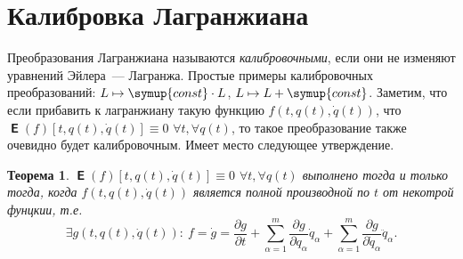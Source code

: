 \documentclass[11pt,a4paper]{article}
\newtheorem{Theorem}{Теорема}[section]
\theoremstyle{definition}
\numberwithin{equation}{section}
\begin{document}
\section{Калибровка Лагранжиана}
Преобразования Лагранжиана называются {\em калибровочными}, если они не изменяют уравнений Эйлера~— Лагранжа. Простые примеры калибровочных преобразований: $L\mapsto\symup{const}\cdot L$, $L\mapsto L+\symup{const}$. Заметим, что если прибавить к лагранжиану такую функцию $f(t,q(t),\dot{q}(t))$, что $\mbfsansE(f)[t,q(t),\dot{q}(t)]\equiv 0$ $\forall t,\forall q(t)$, то такое преобразование также очевидно будет калибровочным. Имеет место следующее утверждение.


\begin{Theorem}
	$\mbfsansE(f)[t,q(t),\dot{q}(t)]\equiv 0$ $\forall t,\forall q(t)$ выполнено тогда и только тогда, когда $f(t,q(t),\dot{q}(t))$ является полной производной по $t$ от некотрой фунцкии, т.е. $$\exists g(t,q(t),\dot{q}(t)):~f=\dot{g}=\dfrac{\partial g}{\partial t}+\sum\limits_{\alpha=1}^m\dfrac{\partial g}{\partial q_\alpha}\dot{q}_\alpha+\sum\limits_{\alpha=1}^m\dfrac{\partial g}{\partial \dot{q}_\alpha}\ddot{q}_\alpha.$$
\end{Theorem}
\end{document}
